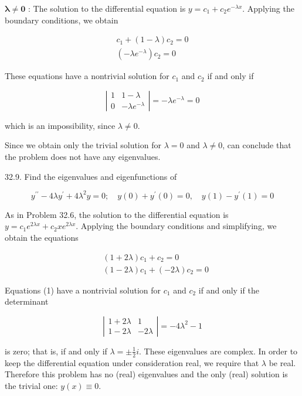 \documentclass[10pt]{article}
\begin{document}
$\boldsymbol{\lambda} \neq \mathbf{0}$ : The solution to the differential equation is $y=c_{1}+c_{2} e^{-\lambda x}$. Applying the boundary conditions, we obtain

$$
\begin{array}{r}
c_{1}+(1-\lambda) c_{2}=0 \\
\left(-\lambda e^{-\lambda}\right) c_{2}=0
\end{array}
$$

These equations have a nontrivial solution for $c_{1}$ and $c_{2}$ if and only if

$$
\left|\begin{array}{cc}
1 & 1-\lambda \\
0 & -\lambda e^{-\lambda}
\end{array}\right|=-\lambda e^{-\lambda}=0
$$

which is an impossibility, since $\lambda \neq 0$.

Since we obtain only the trivial solution for $\lambda=0$ and $\lambda \neq 0$, can conclude that the problem does not have any eigenvalues.

32.9. Find the eigenvalues and eigenfunctions of

$$
y^{\prime \prime}-4 \lambda y^{\prime}+4 \lambda^{2} y=0 ; \quad y(0)+y^{\prime}(0)=0, \quad y(1)-y^{\prime}(1)=0
$$

As in Problem 32.6, the solution to the differential equation is $y=c_{1} e^{2 \lambda x}+c_{2} x e^{2 \lambda x}$. Applying the boundary conditions and simplifying, we obtain the equations


\begin{align*}
& (1+2 \lambda) c_{1}+c_{2}=0  \tag{1}\\
& (1-2 \lambda) c_{1}+(-2 \lambda) c_{2}=0
\end{align*}


Equations (1) have a nontrivial solution for $c_{1}$ and $c_{2}$ if and only if the determinant

$$
\left|\begin{array}{cc}
1+2 \lambda & 1 \\
1-2 \lambda & -2 \lambda
\end{array}\right|=-4 \lambda^{2}-1
$$

is zero; that is, if and only if $\lambda= \pm \frac{1}{2} i$. These eigenvalues are complex. In order to keep the differential equation under consideration real, we require that $\lambda$ be real. Therefore this problem has no (real) eigenvalues and the only (real) solution is the trivial one: $y(x) \equiv 0$.
\end{document}
